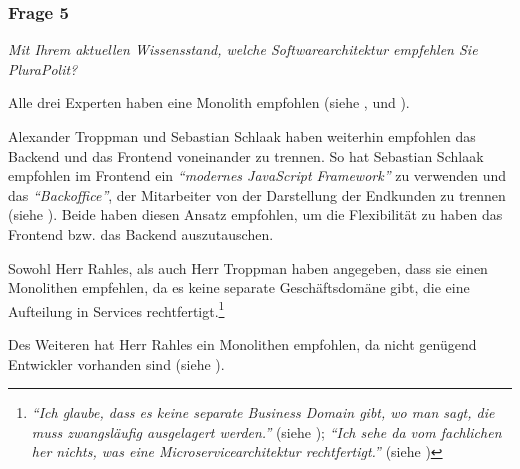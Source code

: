 \subsubsection{Frage 5}

\textit{Mit Ihrem aktuellen Wissensstand, welche Softwarearchitektur empfehlen Sie PluraPolit?}

Alle drei Experten haben eine Monolith empfohlen (siehe ,  und ).

Alexander Troppman und Sebastian Schlaak haben weiterhin empfohlen das Backend und das Frontend voneinander zu trennen. So hat Sebastian Schlaak empfohlen im Frontend ein \textit{\enquote{modernes JavaScript Framework}} zu verwenden und das \textit{\enquote{Backoffice}}, der Mitarbeiter von der Darstellung der Endkunden zu trennen (siehe ). Beide haben diesen Ansatz empfohlen, um die Flexibilität zu haben das Frontend bzw. das Backend auszutauschen.

Sowohl Herr Rahles, als auch Herr Troppman haben angegeben, dass sie einen Monolithen empfehlen, da es keine separate Geschäftsdomäne gibt, die eine Aufteilung in Services rechtfertigt.\footnote{
\textit{\enquote{Ich glaube, dass es keine separate Business Domain gibt, wo man sagt, die muss zwangsläufig ausgelagert werden.}} (siehe ); \textit{\enquote{Ich sehe da vom fachlichen her nichts, was eine Microservicearchitektur rechtfertigt.}} (siehe )
}

Des Weiteren hat Herr Rahles ein Monolithen empfohlen, da nicht genügend Entwickler vorhanden sind (siehe ).